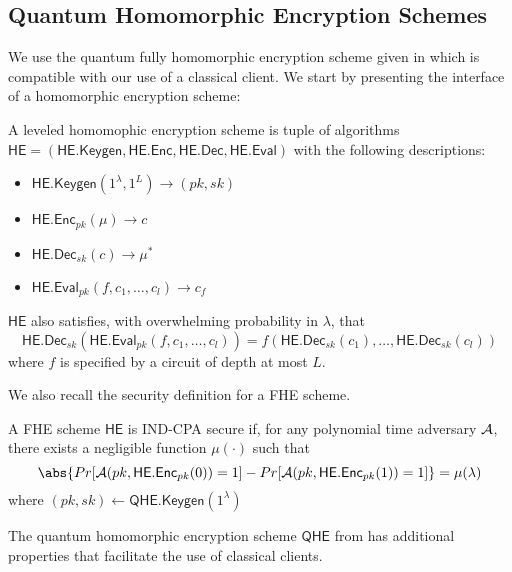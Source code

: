 \subsection{Quantum Homomorphic Encryption Schemes}

\def\QHE{\mathsf{QHE}}
\def\QGen{\mathsf{QHE.Keygen}}
\def\QEnc{\mathsf{QHE.Enc}}
\def\QEval{\mathsf{QHE.Eval}}
\def\QDec{\mathsf{QHE.Dec}}

We use the quantum fully homomorphic encryption scheme given in \cite{mahadev_qfhe} which is compatible with our use of a classical client. We start by presenting the interface of a homomorphic encryption scheme:
\begin{definition}
	A leveled homomophic encryption scheme is tuple of algorithms \linebreak $\mathsf{HE}=(\mathsf{HE.Keygen}, \mathsf{HE.Enc}, \mathsf{HE.Dec}, \mathsf{HE.Eval})$ with the following descriptions:
	\begin{itemize}
		\item $\mathsf{HE.Keygen}(1^\lambda, 1^L)\rightarrow(pk, sk)$
		\item $\mathsf{HE.Enc}_{pk}(\mu)\rightarrow c$
		\item $\mathsf{HE.Dec}_{sk}(c)\rightarrow \mu^*$
		\item $\mathsf{HE.Eval}_{pk}(f, c_1, \ldots, c_l)\rightarrow c_f$
	\end{itemize}
\end{definition}

$\mathsf{HE}$ also satisfies, with overwhelming probability in $\lambda$, that
$$\mathsf{HE.Dec}_{sk}(\mathsf{HE.Eval}_{pk}(f, c_1, \ldots, c_l))=f(\mathsf{HE.Dec}_{sk}(c_1),\ldots,\mathsf{HE.Dec}_{sk}(c_l))$$
where $f$ is specified by a circuit of depth at most $L$.


We also recall the security definition for a FHE scheme.

\begin{definition}
	A FHE scheme $\mathsf{HE}$ is IND-CPA secure if, for any polynomial time adversary $\mathcal{A}$, there exists a negligible function $\mu(\cdot)$ such that
	$$\abs{Pr[\cA(pk, \mathsf{HE.Enc}_{pk}(0))=1]-Pr[\cA(pk, \mathsf{HE.Enc}_{pk}(1))=1]}=\mu(\lambda)$$
	where $(pk, sk)\leftarrow\mathsf{QHE.Keygen}(1^\lambda)$
\end{definition}

The quantum homomorphic encryption scheme $\mathsf{QHE}$ from \cite{mahadev_qfhe} has additional properties that facilitate the use of classical clients.


